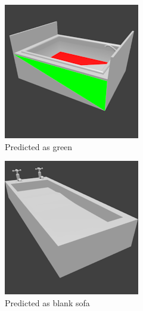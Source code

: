 \begin{figure}
	\begin{subfigure}{.3\textwidth}
		\centering
		\includegraphics[width=.8\textwidth]{images/bathtub_0125_3_004.png}
		\caption{Predicted as green}
		\label{fig:small-features-d}
	\end{subfigure}
	\begin{subfigure}{.3\textwidth}
		\centering
		\includegraphics[width=.8\textwidth]{images/bathtub_0111_0_011.png}
		\caption{Predicted as blank sofa}
		\label{fig:small-features-e}
	\end{subfigure}
	\begin{subfigure}{.3\textwidth}

\end{subfigure}
\end{figure}
